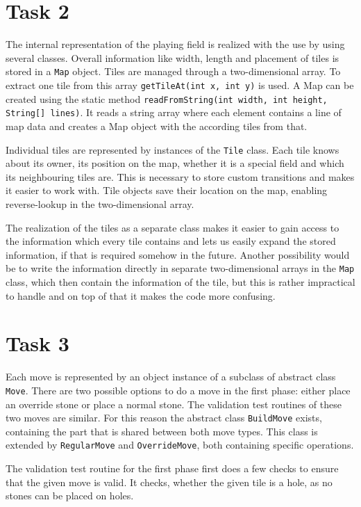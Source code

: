 \documentclass[a4paper,12pt]{article}
\begin{document}
\section{Task 2}
The internal representation of the playing field is realized with the use by using several classes. Overall information like width, length and placement of tiles is stored in a \texttt{Map} object. Tiles are managed through a two-dimensional array. To extract one tile from this array \lstinline{getTileAt(int x, int y)} is used. A Map can be created using the static method \lstinline{readFromString(int width, int height, String[] lines)}. It reads a string array where each element contains a line of map data and creates a Map object with the according tiles from that.

Individual tiles are represented by instances of the \texttt{Tile} class. Each tile knows about its owner, its position on the map, whether it is a special field and which its neighbouring tiles are. This is necessary to store custom transitions and makes it easier to work with. Tile objects save their location on the map, enabling reverse-lookup in the two-dimensional array.

The realization of the tiles as a separate class makes it easier to gain access to the information which every tile contains and lets us easily expand the stored information, if that is required somehow in the future. Another possibility would be to write the information directly in separate two-dimensional arrays in the \texttt{Map} class, which then contain the information of the tile, but this is rather impractical to handle and on top of that it makes the code more confusing.

\section{Task 3}
Each move is represented by an object instance of a subclass of abstract class \texttt{Move}. There are two possible options to do a move in the first phase: either place an override stone or place a normal stone. 
The validation test routines of these two moves are similar. For this reason the abstract class \texttt{BuildMove} exists, containing the part that is shared between both move types. This class is extended by \texttt{RegularMove} and \texttt{OverrideMove}, both containing specific operations.

The validation test routine for the first phase first does a few checks to ensure that the given move is valid. It checks, whether the given tile is a hole, as no stones can be placed on holes.
\end{document}
